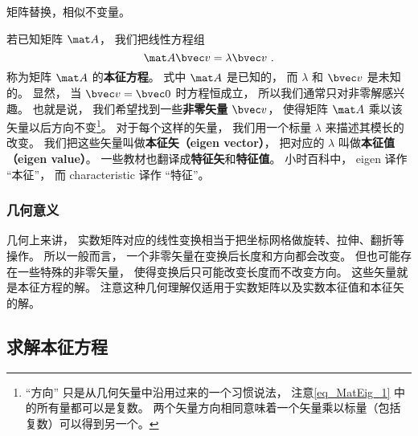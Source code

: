 
\begin{issues}
\issueDraft  矩阵替换，相似不变量。
\end{issues}


若已知矩阵 $\mat A$， 我们把线性方程组
\begin{equation}\label{eq_MatEig_1}
\mat A \bvec v = \lambda \bvec v~.
\end{equation}
称为矩阵 $\mat A$ 的\textbf{本征方程}。 式中 $\mat A$ 是已知的， 而 $\lambda$ 和 $\bvec v$ 是未知的。 显然， 当 $\bvec v = \bvec 0$ 时方程恒成立， 所以我们通常只对非零解感兴趣。 也就是说， 我们希望找到一些\textbf{非零矢量} $\bvec v$， 使得矩阵 $\mat A$ 乘以该矢量以后方向不变\footnote{“方向” 只是从几何矢量中沿用过来的一个习惯说法， 注意\autoref{eq_MatEig_1} 中的所有量都可以是复数。 两个矢量方向相同意味着一个矢量乘以标量（包括复数）可以得到另一个。}。 对于每个这样的矢量， 我们用一个标量 $\lambda$ 来描述其模长的改变。 我们把这些矢量叫做\textbf{本征矢（eigen vector）}， 把对应的 $\lambda$ 叫做\textbf{本征值（eigen value）}。 一些教材也翻译成\textbf{特征矢}和\textbf{特征值}。 小时百科中， eigen 译作 “本征”， 而 characteristic 译作 “特征”。

\subsubsection{几何意义}
几何上来讲， 实数矩阵对应的线性变换相当于把坐标网格做旋转、拉伸、翻折等操作。%
所以一般而言， 一个非零矢量在变换后长度和方向都会改变。 但也可能存在一些特殊的非零矢量， 使得变换后只可能改变长度而不改变方向。 这些矢量就是本征方程的解。 注意这种几何理解仅适用于实数矩阵以及实数本征值和本征矢的解。

\subsection{求解本征方程}\label{sub_MatEig_1}

